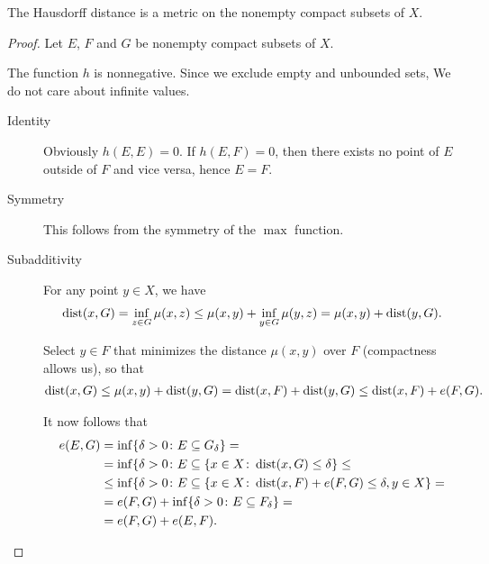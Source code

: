 \begin{proposition}
  The Hausdorff distance is a metric on the nonempty compact subsets of \( X \).
\end{proposition}
\begin{proof}
  Let \( E \), \( F \) and \( G \) be nonempty compact subsets of \( X \).

  The function \( h \) is nonnegative. Since we exclude empty and unbounded sets, We do not care about infinite values.

  \begin{description}
    \item[Identity] Obviously \( h(E, E) = 0 \). If \( h(E, F) = 0 \), then there exists no point of \( E \) outside of \( F \) and vice versa, hence \( E = F \).
    \item[Symmetry] This follows from the symmetry of the \( \max \) function.
    \item[Subadditivity] For any point \( y \in X \), we have
    \begin{align*}
      \operatorname{dist}(x, G)
      =
      \inf_{z \in G} \mu(x, z)
      \leq
      \mu(x, y) + \inf_{y \in G} \mu(y, z)
      =
      \mu(x, y) + \operatorname{dist}(y, G).
    \end{align*}

    Select \( y \in F \) that minimizes the distance \( \mu(x, y) \) over \( F \) (compactness allows us), so that %
    \begin{align*}
      \operatorname{dist}(x, G)
      \leq
      \mu(x, y) + \operatorname{dist}(y, G)
      =
      \operatorname{dist}(x, F) + \operatorname{dist}(y, G)
      \leq
      \operatorname{dist}(x, F) + e(F, G).
    \end{align*}

    It now follows that
    \begin{align*}
      e(E, G)
      &=
      \inf \{\delta > 0 \colon E \subseteq G_\delta \}
      = \\ &=
      \inf \{\delta > 0 \colon E \subseteq \{ x \in X \colon \operatorname{dist}(x, G) \leq \delta \}
      \leq \\ &\leq
      \inf \{\delta > 0 \colon E \subseteq \{ x \in X \colon \operatorname{dist}(x, F) + e(F, G) \leq \delta, y \in X \}
      = \\ &=
      e(F, G) + \inf \{\delta > 0 \colon E \subseteq F_\delta \}
      = \\ &=
      e(F, G) + e(E, F).
    \end{align*}
  \end{description}
\end{proof}
